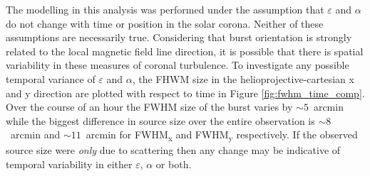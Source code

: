 The modelling in this analysis was performed under the assumption that $\varepsilon$ and $\alpha$ do not change with time or position in the solar corona. Neither of these assumptions are necessarily true. Considering that burst orientation is strongly related to the local magnetic field line direction, it is possible that there is spatial variability in these measures of coronal turbulence. To investigate any possible temporal variance of $\varepsilon$ and $\alpha$, the FHWM size in the helioprojective-cartesian x and y direction are plotted with respect to time in Figure \ref{fig:fwhm_time_comp}. Over the course of an hour the FWHM size of the burst varies by $\sim 5$~arcmin while the biggest difference in source size over the entire observation is $\sim 8$~arcmin and $\sim 11$~arcmin for FWHM\textsubscript{x} and FWHM\textsubscript{y} respectively. If the observed source size were \textit{only} due to scattering then any change may be indicative of temporal variability in either $\varepsilon$, $\alpha$ or both.




